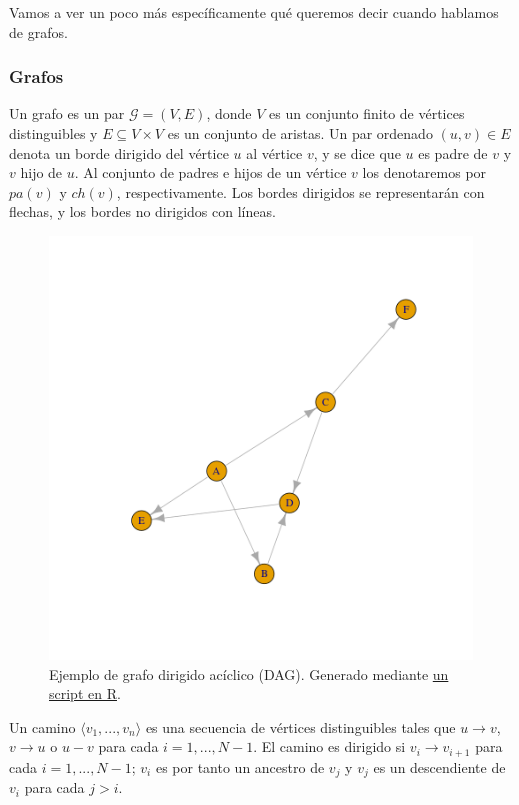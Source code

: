 Vamos a ver un poco más específicamente qué queremos decir cuando hablamos de grafos.
\subsubsection{Grafos}
\begin{definicion} \label{def:grafo}
Un grafo es un par $\mathcal{G} = (V, E)$, donde $V$ es un conjunto finito de vértices distinguibles y 
$E \subseteq V \times V$ es un conjunto de aristas. Un par ordenado $(u, v) \in E$ denota un borde dirigido
del vértice $u$ al vértice $v$, y se dice que $u$ es padre de $v$ y $v$ hijo de $u$. Al conjunto de padres 
e hijos de un vértice $v$ los denotaremos por $pa(v)$ y $ch(v)$, respectivamente. Los bordes dirigidos 
se representarán con flechas, y los bordes no dirigidos con líneas. 
\end{definicion}

\begin{figure}[h!]
    \centering
     \includegraphics[width=\textwidth]{./img/dag.png}
     \caption{Ejemplo de grafo dirigido acíclico (DAG). Generado mediante \href{https://github.com/ElenaMerelo/TFG/blob/master/scripts/dag.R}{un script en R}.}
     \label{img:dag1}
\end{figure}

Un camino $ \langle v_{1},...,v_{n} \rangle $ 
es una secuencia de vértices distinguibles tales que $u \rightarrow v$, $v \rightarrow u$ o $u - v$ para 
cada $i= 1,..., N-1$. El camino es dirigido si $v_{i} \rightarrow v_{i+1}$ 
para cada $i= 1,..., N-1$; $v_{i}$ es por tanto un ancestro de $v_{j}$ y $v_{j}$ es un descendiente de 
$v_{i}$ para cada $j > i$. 

